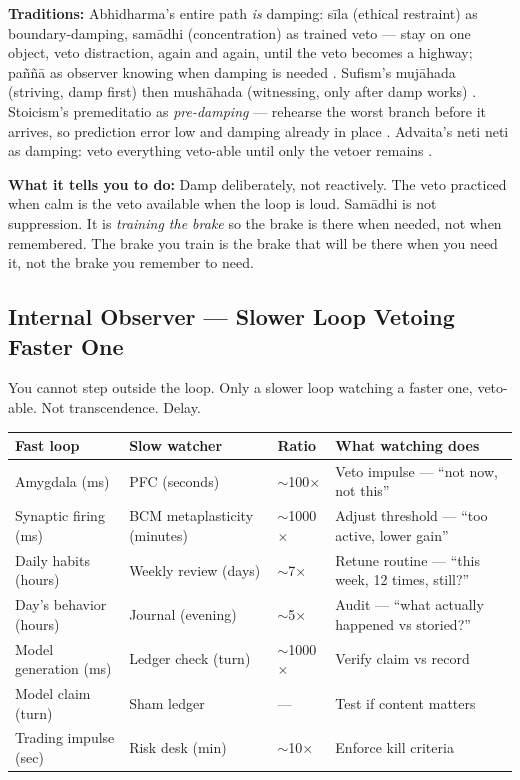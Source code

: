 \documentclass[11pt]{article}
\begin{document}
\textbf{Traditions:} Abhidharma's entire path \emph{is} damping: s\=ila (ethical restraint) as boundary-damping, sam\=adhi (concentration) as trained veto --- stay on one object, veto distraction, again and again, until the veto becomes a highway; pa\~n\~n\=a as observer knowing when damping is needed \citep{ghazali1106ihya}. Sufism's muj\=ahada (striving, damp first) then mush\=ahada (witnessing, only after damp works) \citep{ibnarabi1238futuhat}. Stoicism's premeditatio as \emph{pre-damping} --- rehearse the worst branch before it arrives, so prediction error low and damping already in place \citep{ghazali1111munqidh}. Advaita's neti neti as damping: veto everything veto-able until only the vetoer remains \citep{ibnarabi1229fusus}.

\textbf{What it tells you to do:} Damp deliberately, not reactively. The veto practiced when calm is the veto available when the loop is loud. Sam\=adhi is not suppression. It is \emph{training the brake} so the brake is there when needed, not when remembered. The brake you train is the brake that will be there when you need it, not the brake you remember to need.

\subsection{Internal Observer --- Slower Loop Vetoing Faster One}

You cannot step outside the loop. Only a slower loop watching a faster one, veto-able. Not transcendence. Delay.

\begin{center}
\small
\begin{tabular}{p{2.8cm}p{2.8cm}p{1.4cm}p{4.2cm}}
\toprule
Fast loop & Slow watcher & Ratio & What watching does \\
\midrule
Amygdala (ms) & PFC (seconds) & $\sim$100$\times$ & Veto impulse --- ``not now, not this'' \\
Synaptic firing (ms) & BCM metaplasticity (minutes) & $\sim$1000$\times$ & Adjust threshold --- ``too active, lower gain'' \\
Daily habits (hours) & Weekly review (days) & $\sim$7$\times$ & Retune routine --- ``this week, 12 times, still?'' \\
Day's behavior (hours) & Journal (evening) & $\sim$5$\times$ & Audit --- ``what actually happened vs storied?'' \\
Model generation (ms) & Ledger check (turn) & $\sim$1000$\times$ & Verify claim vs record \\
Model claim (turn) & Sham ledger & --- & Test if content matters \\
Trading impulse (sec) & Risk desk (min) & $\sim$10$\times$ & Enforce kill criteria \\
\bottomrule
\end{tabular}
\end{center}
\end{document}
